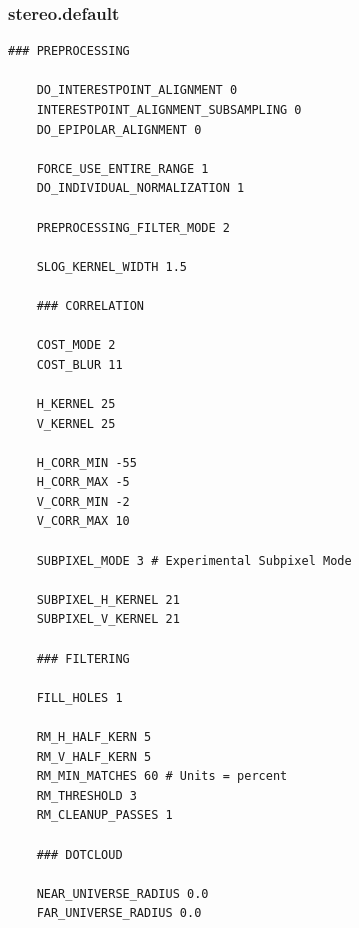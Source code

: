 \subsubsection*{stereo.default}

\begin{center}\begin{minipage}{5.5in}
\begin{Verbatim}[frame=single,fontsize=\small,label=stereo.default for Cassini ISS]
    ### PREPROCESSING

    DO_INTERESTPOINT_ALIGNMENT 0
    INTERESTPOINT_ALIGNMENT_SUBSAMPLING 0
    DO_EPIPOLAR_ALIGNMENT 0

    FORCE_USE_ENTIRE_RANGE 1
    DO_INDIVIDUAL_NORMALIZATION 1

    PREPROCESSING_FILTER_MODE 2

    SLOG_KERNEL_WIDTH 1.5

    ### CORRELATION

    COST_MODE 2
    COST_BLUR 11

    H_KERNEL 25
    V_KERNEL 25

    H_CORR_MIN -55
    H_CORR_MAX -5
    V_CORR_MIN -2
    V_CORR_MAX 10

    SUBPIXEL_MODE 3 # Experimental Subpixel Mode

    SUBPIXEL_H_KERNEL 21
    SUBPIXEL_V_KERNEL 21

    ### FILTERING

    FILL_HOLES 1

    RM_H_HALF_KERN 5
    RM_V_HALF_KERN 5
    RM_MIN_MATCHES 60 # Units = percent
    RM_THRESHOLD 3
    RM_CLEANUP_PASSES 1

    ### DOTCLOUD

    NEAR_UNIVERSE_RADIUS 0.0
    FAR_UNIVERSE_RADIUS 0.0
\end{Verbatim}
\end{minipage}\end{center}
